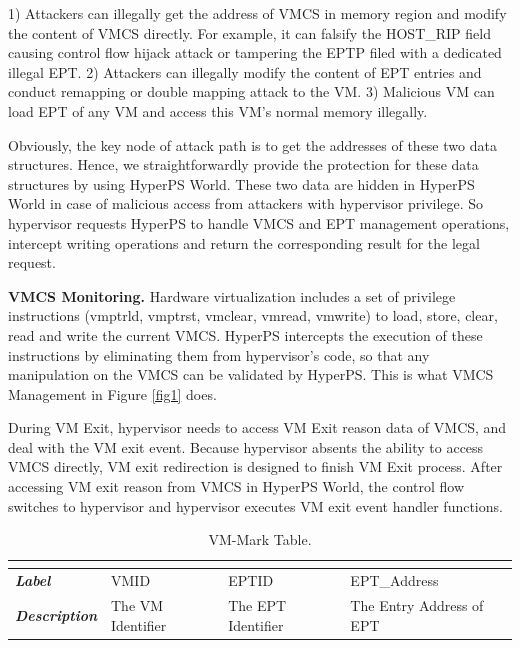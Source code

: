 \documentclass[conference]{IEEEtran}
\begin{document}
1) Attackers can illegally get the address of VMCS in memory region and modify the content of VMCS directly. For example, it can falsify the HOST\_RIP field causing control flow hijack attack or tampering the EPTP filed with a dedicated illegal EPT.
2) Attackers can illegally modify the content of EPT entries
and conduct remapping or double mapping attack to the VM.
3) Malicious VM can load EPT of any VM and access this VM's normal memory illegally.

Obviously, the key node of attack path is to get the addresses of these two data structures.
Hence, we straightforwardly provide the protection for these data structures by using HyperPS World. These two data are hidden in HyperPS World in case of malicious access from attackers with hypervisor privilege. 
So hypervisor requests HyperPS to handle VMCS and EPT management operations, intercept writing operations and return the corresponding result for the legal request. 

\textbf{VMCS Monitoring.}
Hardware virtualization includes a set of privilege instructions (vmptrld, vmptrst, vmclear, vmread, vmwrite) to load, store, clear, read and write the current VMCS. HyperPS intercepts the execution of these instructions by eliminating them from hypervisor's code, so that any manipulation on the VMCS can be validated by HyperPS. This is what VMCS Management in Figure \ref{fig1} does.

During VM Exit, hypervisor needs to access VM Exit reason data of VMCS, and deal with the VM exit event.
Because hypervisor absents the ability to access VMCS directly, VM exit redirection is designed to finish VM Exit process. After accessing VM exit reason from VMCS in HyperPS World, the control flow switches to hypervisor and hypervisor executes VM exit event handler functions.


\begin{table}[htbp]
\centering
\caption{VM-Mark Table.}\label{tab1}
\begin{tabular}{p{1.4cm}|p{1.2cm}|p{1.1cm}|p{1.7cm}}
\hline
\multicolumn{4}{c}{\bfseries\textbf\centering{VM-Mark Table}}\\
\hline
{\itshape\bfseries Label} & VMID & EPTID & EPT\_Address\\
\hline
{\itshape\bfseries Description} & { The VM Identifier} & The EPT Identifier & The Entry Address of EPT\\
\hline
\end{tabular}
\end{table}
\end{document}
